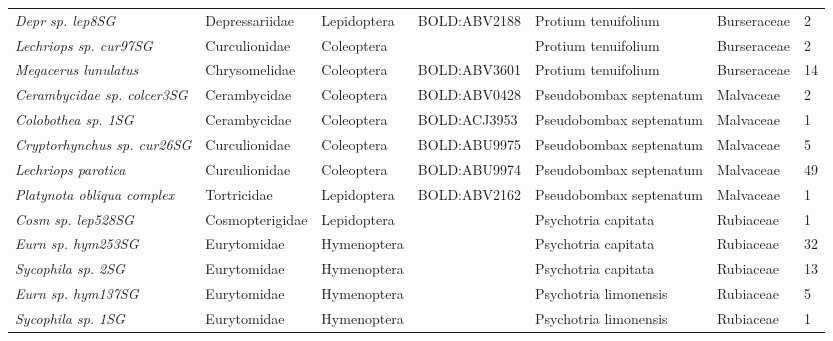 \documentclass[11pt]{article}
\begin{document}
\begin{landscape}
\begin{longtable}{@{}lllllll@{}}
\textit{Depr sp. lep8SG}                              & Depressariidae  & Lepidoptera  & BOLD:ABV2188 & Protium tenuifolium                & Burseraceae      & 2     \\
\textit{Lechriops sp. cur97SG}                        & Curculionidae   & Coleoptera   &              & Protium tenuifolium                & Burseraceae      & 2     \\
\textit{Megacerus lunulatus}                          & Chrysomelidae   & Coleoptera   & BOLD:ABV3601 & Protium tenuifolium                & Burseraceae      & 14    \\
\textit{Cerambycidae sp. colcer3SG}                   & Cerambycidae    & Coleoptera   & BOLD:ABV0428 & Pseudobombax septenatum            & Malvaceae        & 2     \\
\textit{Colobothea sp. 1SG}                           & Cerambycidae    & Coleoptera   & BOLD:ACJ3953 & Pseudobombax septenatum            & Malvaceae        & 1     \\
\textit{Cryptorhynchus sp. cur26SG}                   & Curculionidae   & Coleoptera   & BOLD:ABU9975 & Pseudobombax septenatum            & Malvaceae        & 5     \\
\textit{Lechriops parotica}                           & Curculionidae   & Coleoptera   & BOLD:ABU9974 & Pseudobombax septenatum            & Malvaceae        & 49    \\
\textit{Platynota obliqua complex}                    & Tortricidae     & Lepidoptera  & BOLD:ABV2162 & Pseudobombax septenatum            & Malvaceae        & 1     \\
\textit{Cosm sp. lep528SG}                            & Cosmopterigidae & Lepidoptera  &              & Psychotria capitata                & Rubiaceae        & 1     \\
\textit{Eurn sp. hym253SG}                            & Eurytomidae     & Hymenoptera  &              & Psychotria capitata                & Rubiaceae        & 32    \\
\textit{Sycophila sp. 2SG}                            & Eurytomidae     & Hymenoptera  &              & Psychotria capitata                & Rubiaceae        & 13    \\
\textit{Eurn sp. hym137SG}                            & Eurytomidae     & Hymenoptera  &              & Psychotria limonensis              & Rubiaceae        & 5     \\
\textit{Sycophila sp. 1SG}                            & Eurytomidae     & Hymenoptera  &              & Psychotria limonensis              & Rubiaceae        & 1     \\

\end{longtable}
\end{landscape}
\end{document}
